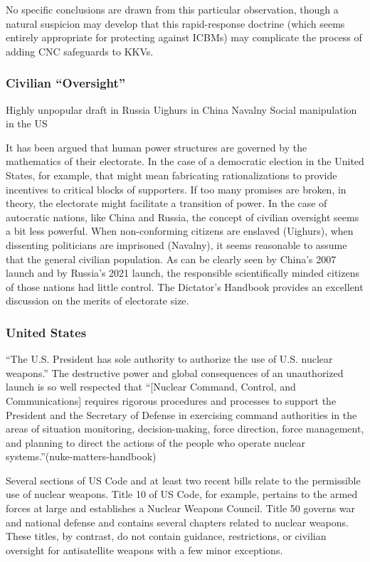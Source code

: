No specific conclusions are drawn from this particular observation,
though a natural suspicion may develop that this rapid-response
doctrine (which seems entirely appropriate for protecting against
ICBMs) may complicate the process of adding CNC safeguards to KKVs.

\subsubsection{Civilian ``Oversight''}
Highly unpopular draft in Russia
Uighurs in China
Navalny
Social manipulation in the US

It has been argued that human power structures are governed by the
mathematics of their electorate.\cite[dictator]{fixme} In the case of
a democratic election in the United States, for example, that might
mean fabricating rationalizations to provide incentives to critical
blocks of supporters.  If too many promises are broken, in theory, the
electorate might facilitate a transition of power.  In the case of
autocratic nations, like China and Russia, the concept of civilian
oversight seems a bit less powerful.  When non-conforming citizens are
enslaved (Uighurs), when dissenting politicians are imprisoned
(Navalny), it seems reasonable to assume that the general civilian
population.  As can be clearly seen by China's 2007 launch and by
Russia's 2021 launch, the responsible scientifically minded citizens
of those nations had little control.  The Dictator's Handbook provides
an excellent discussion on the merits of electorate size.


\subsubsection{United States}
``The U.S. President has sole authority to authorize the use of
U.S. nuclear weapons.''  The destructive power and global consequences
of an unauthorized launch is so well respected that ``[Nuclear
  Command, Control, and Communications] requires rigorous procedures
and processes to support the President and the Secretary of Defense in
exercising command authorities in the areas of situation monitoring,
decision-making, force direction, force management, and planning to
direct the actions of the people who operate nuclear
systems.''(nuke-matters-handbook)

Several sections of US Code and at least two recent bills relate to
the permissible use of nuclear weapons.  Title 10 of US Code, for
example, pertains to the armed forces at large and establishes a
Nuclear Weapons Council.  Title 50 governs war and national defense
and contains several chapters related to nuclear weapons.  These
titles, by contrast, do not contain guidance, restrictions, or
civilian oversight for antisatellite weapons with a few minor
exceptions.

